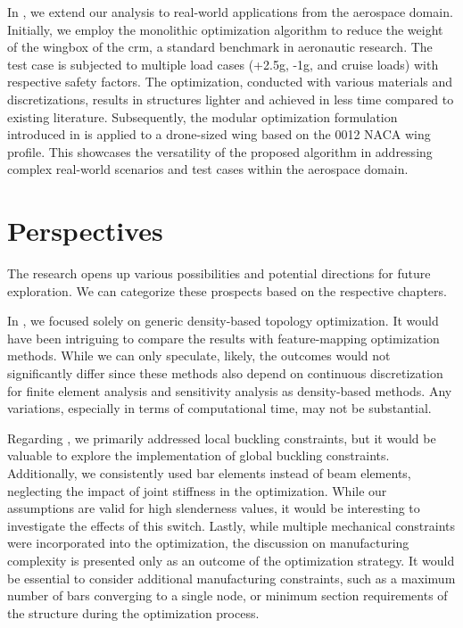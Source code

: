 In , we extend our analysis to real-world applications from the aerospace domain. Initially, we employ the monolithic optimization algorithm to reduce the weight of the wingbox of the \gls{crm}, a standard benchmark in aeronautic research. The test case is subjected to multiple load cases (+2.5g, -1g, and cruise loads) with respective safety factors. The optimization, conducted with various materials and discretizations, results in structures lighter and achieved in less time compared to existing literature. Subsequently, the modular optimization formulation introduced in  is applied to a drone-sized wing based on the 0012 NACA wing profile. This showcases the versatility of the proposed algorithm in addressing complex real-world scenarios and test cases within the aerospace domain.

\section*{Perspectives}
The research opens up various possibilities and potential directions for future exploration. We can categorize these prospects based on the respective chapters.

In , we focused solely on generic density-based topology optimization. It would have been intriguing to compare the results with feature-mapping optimization methods. While we can only speculate, likely, the outcomes would not significantly differ since these methods also depend on continuous discretization for finite element analysis and sensitivity analysis as density-based methods. Any variations, especially in terms of computational time, may not be substantial.

Regarding , we primarily addressed local buckling constraints, but it would be valuable to explore the implementation of global buckling constraints. Additionally, we consistently used bar elements instead of beam elements, neglecting the impact of joint stiffness in the optimization. While our assumptions are valid for high slenderness values, it would be interesting to investigate the effects of this switch. Lastly, while multiple mechanical constraints were incorporated into the optimization, the discussion on manufacturing complexity is presented only as an outcome of the optimization strategy. It would be essential to consider additional manufacturing constraints, such as a maximum number of bars converging to a single node, or minimum section requirements of the structure during the optimization process. 

